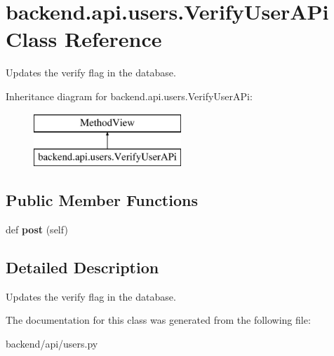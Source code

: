 \hypertarget{classbackend_1_1api_1_1users_1_1_verify_user_a_pi}{}\section{backend.\+api.\+users.\+Verify\+User\+A\+Pi Class Reference}
\label{classbackend_1_1api_1_1users_1_1_verify_user_a_pi}


Updates the verify flag in the database.  


Inheritance diagram for backend.\+api.\+users.\+Verify\+User\+A\+Pi\+:\begin{figure}[H]
\begin{center}
\leavevmode
\includegraphics[height=2.000000cm]{classbackend_1_1api_1_1users_1_1_verify_user_a_pi}
\end{center}
\end{figure}
\subsection*{Public Member Functions}
\begin{DoxyCompactItemize}
\item 
\hypertarget{classbackend_1_1api_1_1users_1_1_verify_user_a_pi_ada7058c93366252e9b18c10bb25ddb7c}{}def {\bfseries post} (self)\label{classbackend_1_1api_1_1users_1_1_verify_user_a_pi_ada7058c93366252e9b18c10bb25ddb7c}

\end{DoxyCompactItemize}


\subsection{Detailed Description}
Updates the verify flag in the database. 

The documentation for this class was generated from the following file\+:\begin{DoxyCompactItemize}
\item 
backend/api/users.\+py\end{DoxyCompactItemize}
